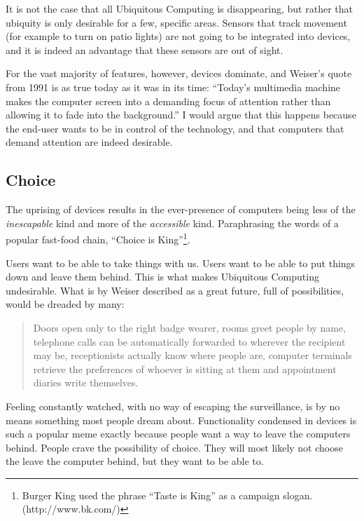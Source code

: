 It is not the case that all Ubiquitous Computing is disappearing, but rather
that ubiquity is only desirable for a few, specific areas. Sensors that track movement (for example to turn on patio lights) are not going to be integrated
into devices, and it is indeed an advantage that these sensors are out of sight.

For the vast majority of features, however, devices dominate, and Weiser's quote from 1991 is as true today as it was in its
time: ``Today's multimedia machine makes the computer screen into a demanding focus of attention rather than allowing it to fade into the
background.''\cite{weiser91} I would argue that this happens because the end-user wants to be in control of the technology, and that
computers that demand attention are indeed desirable.

\subsection*{Choice}

The uprising of devices results in the ever-presence of computers being less of the \emph{inescapable} kind and more of the \emph{accessible}
kind. Paraphrasing the words of a popular fast-food chain, ``Choice is King''\footnote{Burger King used the phrase ``Taste is King'' as a campaign slogan. (http://www.bk.com/)}.

Users want to be able to take things with us. Users want to be able to put things down and leave them behind. This is what makes Ubiquitous Computing undesirable.
What is by Weiser described as a great future, full of possibilities, would be dreaded by many:

\begin{quote}
    Doors open only to the right badge wearer, rooms greet people by name, telephone calls can be automatically forwarded to
    wherever the recipient may be, receptionists actually know where people are, computer terminals retrieve the preferences
    of whoever is sitting at them and appointment diaries write themselves.\cite{weiser91}
\end{quote}

Feeling constantly watched, with no way of escaping the surveillance, is by no means something most people dream about.
Functionality condensed in devices is such a popular meme exactly because people want a way to leave the computers behind.
People crave the possibility of choice. They will most likely not choose the leave the computer behind, but they want to
be able to.


